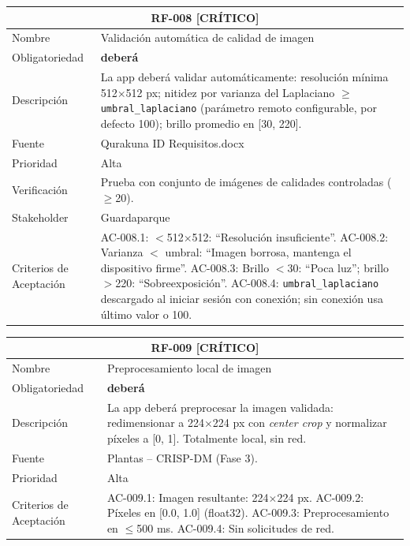 \documentclass[12pt, a4paper]{article}
\newcommand{\criticomark}{\textcolor{criticolor}{\textbf{[CR\'ITICO]}}}
\begin{document}
\begin{longtable}{|p{3cm}|p{11.5cm}|}
\hline
\multicolumn{2}{|c|}{\textbf{RF-008} \criticomark} \\
\hline
Nombre & Validaci\'on autom\'atica de calidad de imagen \\
\hline
Obligatoriedad & \textbf{deber\'a} \\
\hline
Descripci\'on & La app deber\'a validar autom\'aticamente: resoluci\'on m\'inima 512$\times$512 px; nitidez por varianza del Laplaciano $\geq$ \texttt{umbral\_laplaciano} (par\'ametro remoto configurable, por defecto 100); brillo promedio en [30, 220]. \\
\hline
Fuente & Qurakuna ID Requisitos.docx \\
\hline
Prioridad & Alta \\
\hline
Verificaci\'on & Prueba con conjunto de im\'agenes de calidades controladas ($\geq$20). \\
\hline
Stakeholder & Guardaparque \\
\hline
Criterios de Aceptaci\'on &
AC-008.1: $<$512$\times$512: ``Resoluci\'on insuficiente''. \newline
AC-008.2: Varianza $<$ umbral: ``Imagen borrosa, mantenga el dispositivo firme''. \newline
AC-008.3: Brillo $<$30: ``Poca luz''; brillo $>$220: ``Sobreexposici\'on''. \newline
AC-008.4: \texttt{umbral\_laplaciano} descargado al iniciar sesi\'on con conexi\'on; sin conexi\'on usa \'ultimo valor o 100. \\
\hline
\end{longtable}

\begin{longtable}{|p{3cm}|p{11.5cm}|}
\hline
\multicolumn{2}{|c|}{\textbf{RF-009} \criticomark} \\
\hline
Nombre & Preprocesamiento local de imagen \\
\hline
Obligatoriedad & \textbf{deber\'a} \\
\hline
Descripci\'on & La app deber\'a preprocesar la imagen validada: redimensionar a 224$\times$224 px con \textit{center crop} y normalizar p\'ixeles a [0, 1]. Totalmente local, sin red. \\
\hline
Fuente & Plantas -- CRISP-DM (Fase 3). \\
\hline
Prioridad & Alta \\
\hline
Criterios de Aceptaci\'on &
AC-009.1: Imagen resultante: 224$\times$224 px. \newline
AC-009.2: P\'ixeles en [0.0, 1.0] (float32). \newline
AC-009.3: Preprocesamiento en $\leq$500 ms. \newline
AC-009.4: Sin solicitudes de red. \\
\hline
\end{longtable}
\end{document}
